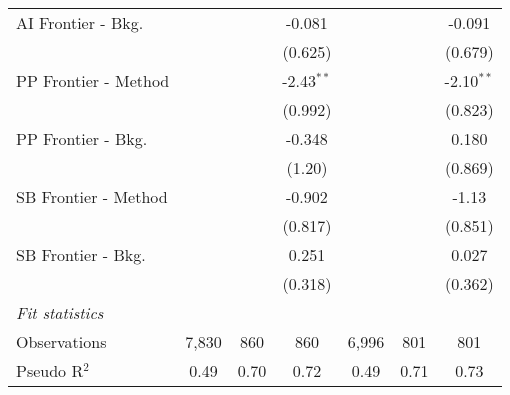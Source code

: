 \begin{tabular}{lcccccc}
   AI Frontier - Bkg.   &               &              & -0.081        &               &              & -0.091\\   
                        &               &              & (0.625)       &               &              & (0.679)\\   
   PP Frontier - Method &               &              & -2.43$^{**}$  &               &              & -2.10$^{**}$\\   
                        &               &              & (0.992)       &               &              & (0.823)\\   
   PP Frontier - Bkg.   &               &              & -0.348        &               &              & 0.180\\   
                        &               &              & (1.20)        &               &              & (0.869)\\   
   SB Frontier - Method &               &              & -0.902        &               &              & -1.13\\   
                        &               &              & (0.817)       &               &              & (0.851)\\   
   SB Frontier - Bkg.   &               &              & 0.251         &               &              & 0.027\\   
                        &               &              & (0.318)       &               &              & (0.362)\\   
   \midrule
   \emph{Fit statistics}\\
   Observations         & 7,830         & 860          & 860           & 6,996         & 801          & 801\\  
   Pseudo R$^2$         & 0.49          & 0.70         & 0.72          & 0.49          & 0.71         & 0.73\\  
   

\end{tabular}
